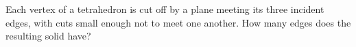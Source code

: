 Each vertex of a tetrahedron is cut off by a plane meeting its three incident edges, with cuts small enough not to meet one another. How many edges does the resulting solid have?

